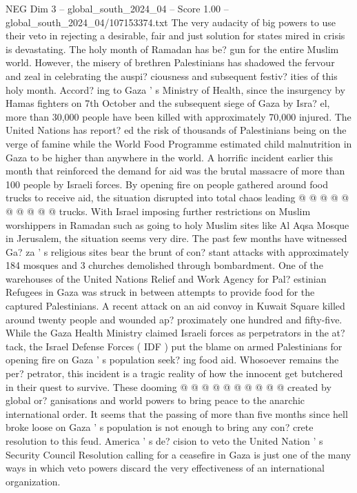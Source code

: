 \begin{textsample}{NEG Dim 3 – global\_south\_2024\_04 – Score 1.00 – global\_south\_2024\_04/107153374.txt}  \label{ex:f3_neg_267}
The very audacity of big powers to use their veto in rejecting a desirable, fair and just solution for states mired in crisis is devastating.
The holy month of Ramadan has be? gun for the entire Muslim world.
However, the misery of brethren Palestinians has shadowed the fervour and zeal in celebrating the auspi? ciousness and subsequent festiv? ities of this holy month.
Accord? ing to Gaza ' s Ministry of Health, since the insurgency by Hamas fighters on 7th October and the subsequent siege of Gaza by Isra? el, more than 30,000 people have been killed with approximately 70,000 injured.
The United Nations has report? ed the risk of thousands of Palestinians being on the verge of famine while the World Food Programme estimated child malnutrition in Gaza to be higher than anywhere in the world.
A horrific incident earlier this month that reinforced the demand for aid was the brutal massacre of more than 100 people by Israeli forces.
By opening fire on people gathered around food trucks to receive aid, the situation disrupted into total chaos leading @ @ @ @ @ @ @ @ @ @ trucks.
With Israel imposing further restrictions on Muslim worshippers in Ramadan such as going to holy Muslim sites like Al Aqsa Mosque in Jerusalem, the situation seems very dire.
The past few months have witnessed Ga? za ' s religious sites bear the brunt of con? stant attacks with approximately 184 mosques and 3 churches demolished through bombardment.
One of the warehouses of the United Nations Relief and Work Agency for Pal? estinian Refugees in Gaza was struck in between attempts to provide food for the captured Palestinians.
A recent attack on an aid convoy in Kuwait Square killed around twenty people and wounded ap? proximately one hundred and fifty-five.
While the Gaza Health Ministry claimed Israeli forces as perpetrators in the at? tack, the Israel Defense Forces ( IDF ) put the blame on armed Palestinians for opening fire on Gaza ' s population seek? ing food aid.
Whosoever remains the per? petrator, this incident is a tragic reality of how the innocent get butchered in their quest to survive.
These dooming @ @ @ @ @ @ @ @ @ @ created by global or? ganisations and world powers to bring peace to the anarchic international order.
It seems that the passing of more than five months since hell broke loose on Gaza ' s population is not enough to bring any con? crete resolution to this feud.
America ' s de? cision to veto the United Nation ' s Security Council Resolution calling for a ceasefire in Gaza is just one of the many ways in which veto powers discard the very effectiveness of an international organization.

\end{textsample}
